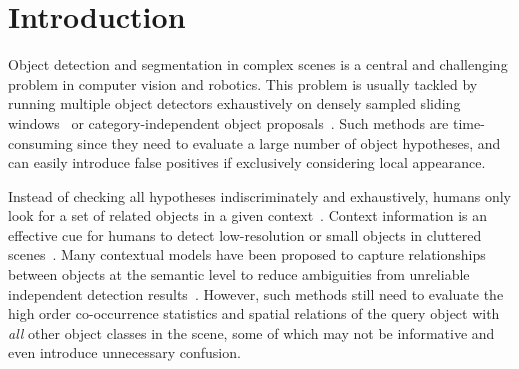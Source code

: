 \section{Introduction}

Object detection and segmentation in complex scenes is a central and challenging problem in computer vision and robotics.
This problem is usually tackled by running multiple object detectors exhaustively on densely sampled sliding windows~\cite{felzenszwalb2010object} or category-independent object proposals~\cite{carreira2012cpmc,van2011segmentation,arbelaez2014multiscale}. 
Such methods are time-consuming since they need to evaluate a large number of object hypotheses, and can easily introduce false positives if exclusively considering local appearance.

Instead of checking all hypotheses indiscriminately and exhaustively, humans only look for a set of related objects in a given context~\cite{biederman1982scene, hock1974contextual}. Context information is an effective cue for humans to detect low-resolution or small objects in cluttered scenes~\cite{parikh2012exploring}. Many contextual models have been proposed to capture relationships between objects at the semantic level to reduce ambiguities from
unreliable independent detection results~\cite{gould2009decomposing, galleguillos2010context, ladicky2010graph}. %
However, such methods still need to evaluate the high order co-occurrence statistics and spatial relations of the query object with \emph{all} other object classes in the scene, some of which may not be informative and even introduce unnecessary confusion.  

